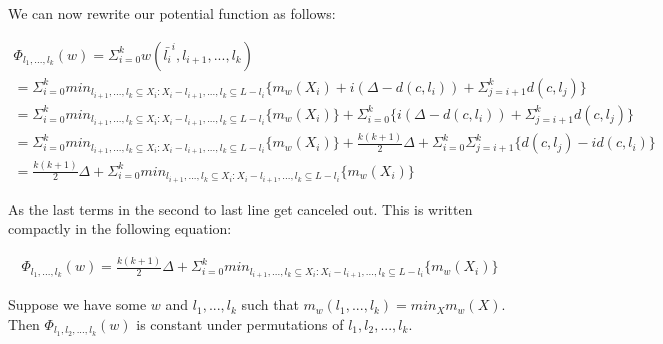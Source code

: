 We can now rewrite our potential function as follows: 

\begin{equation*}
    \begin{gathered}
        \Phi_{l_1, ..., l_k} (w) = \Sigma_{i=0}^k w(\bar{l_i}^i, l_{i+1}, ..., l_k) \\
        = \Sigma_{i=0}^k min_{l_{i+1}, ..., l_k \subseteq X_i : X_i - l_{i+1}, ..., l_k \subseteq L - l_i} \{ m_w(X_i) + i(\Delta - d(c, l_i)) + \Sigma_{j=i+1}^k d(c, l_j)\} \\
        = \Sigma_{i=0}^k min_{l_{i+1}, ..., l_k \subseteq X_i : X_i - l_{i+1}, ..., l_k \subseteq L - l_i} \{ m_w(X_i) \} + \Sigma_{i=0}^k \{i(\Delta - d(c, l_i)) + \Sigma_{j=i+1}^k d(c, l_j)\} \\
        = \Sigma_{i=0}^k min_{l_{i+1}, ..., l_k \subseteq X_i : X_i - l_{i+1}, ..., l_k \subseteq L - l_i} \{ m_w(X_i) \} + \frac{k(k+1)}{2}\Delta + \Sigma_{i=0}^k \Sigma_{j=i+1}^k \{d(c, l_j) - i d(c, l_i)\} \\
        = \frac{k(k+1)}{2}\Delta + \Sigma_{i=0}^k min_{l_{i+1}, ..., l_k \subseteq X_i : X_i - l_{i+1}, ..., l_k \subseteq L - l_i} \{ m_w(X_i)\}
    \end{gathered}
\end{equation*}

As the last terms in the second to last line get canceled out. This is written compactly in the following equation:

\begin{equation}
    \begin{gathered}
        \label{eq:repotential}
        \Phi_{l_1, ..., l_k} (w) = \frac{k(k+1)}{2}\Delta + \Sigma_{i=0}^k min_{l_{i+1}, ..., l_k \subseteq X_i : X_i - l_{i+1}, ..., l_k \subseteq L - l_i} \{ m_w(X_i)\}
    \end{gathered}
\end{equation}

\begin{lemma}
    Suppose we have some $w$ and $l_1, ..., l_k$ such that $m_w(l_1, ..., l_k) = min_X m_w(X)$. Then $\Phi_{l_1, l_2, ..., l_k}(w)$ is constant under permutations of $l_1, l_2, ..., l_k$.
\end{lemma}

